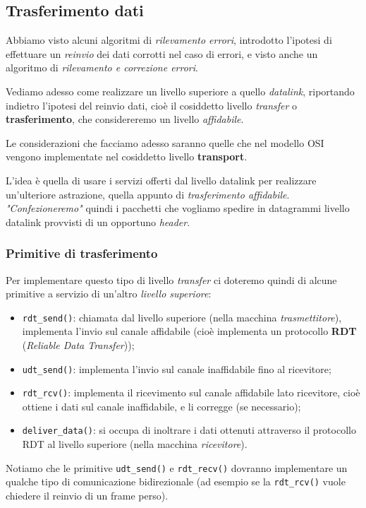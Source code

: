\documentclass[a4paper,11pt]{article}
\begin{document}
\subsection{Trasferimento dati}
Abbiamo visto alcuni algoritmi di \textit{rilevamento errori}, introdotto l'ipotesi di effettuare un \textit{reinvio} dei dati corrotti nel caso di errori, e visto anche un algoritmo di \textit{rilevamento e correzione errori}.

Vediamo adesso come realizzare un livello superiore a quello \textit{datalink}, riportando indietro l'ipotesi del reinvio dati, cioè il cosiddetto livello \textit{transfer} o \textbf{trasferimento}, che considereremo un livello \textit{affidabile}.

Le considerazioni che facciamo adesso saranno quelle che nel modello OSI vengono implementate nel cosiddetto livello \textbf{transport}.

L'idea è quella di usare i servizi offerti dal livello datalink per realizzare un'ulteriore astrazione, quella appunto di \textit{trasferimento affidabile}.
\textit{"Confezioneremo"} quindi i pacchetti che vogliamo spedire in datagrammi livello datalink provvisti di un opportuno \textit{header}.

\subsubsection{Primitive di trasferimento}
Per implementare questo tipo di livello \textit{transfer} ci doteremo quindi di alcune primitive a servizio di un'altro \textit{livello superiore}:
\begin{itemize}
	\item \lstinline|rdt_send()|: chiamata dal livello superiore (nella macchina \textit{trasmettitore}), implementa l'invio sul canale affidabile (cioè implementa un protocollo \textbf{RDT} (\textit{Reliable Data Transfer}));
	\item \lstinline|udt_send()|: implementa l'invio sul canale inaffidabile fino al ricevitore;
	\item \lstinline|rdt_rcv()|: implementa il ricevimento sul canale affidabile lato ricevitore, cioè ottiene i dati sul canale inaffidabile, e li corregge (se necessario); 
	\item \lstinline|deliver_data()|: si occupa di inoltrare i dati ottenuti attraverso il protocollo RDT al livello superiore (nella macchina \textit{ricevitore}).
\end{itemize}

Notiamo che le primitive \lstinline|udt_send()| e \lstinline|rdt_recv()| dovranno implementare un qualche tipo di comunicazione bidirezionale (ad esempio se la \lstinline|rdt_rcv()| vuole chiedere il reinvio di un frame perso).
\end{document}
